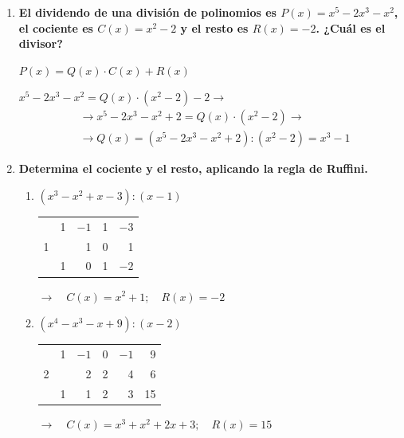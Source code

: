 \documentclass[a4paper,12pt]{article}
\begin{document}
\begin{enumerate}
\begin{enumerate}[label=\textbf{\alph*)}]
            \item $(x^5 + 2x^3 - 1) : (x^2 - 3) \longrightarrow \begin{cases} \text{Cociente} = x^3 + 5x \\ \text{Resto} = 15x - 1 \end{cases}$
        \end{enumerate}
    \item \textbf{El dividendo de una división de polinomios es $P(x) = x^5 - 2x^3 - x^2$, el cociente es $C(x) = x^2 - 2$ y el resto es $R(x) = -2$. ¿Cuál es el divisor?}

        \vspace{0.3cm}

        $P(x) = Q(x) \cdot C(x) + R(x)$

        $x^5 - 2x^3 - x^2 = Q(x) \cdot (x^2 - 2) - 2 \longrightarrow$
        \begin{align*}
        &\longrightarrow x^5 - 2x^3 - x^2 + 2 = Q(x) \cdot (x^2 - 2) \longrightarrow \\
        &\longrightarrow Q(x) = (x^5 - 2x^3 - x^2 + 2) : (x^2 - 2) = x^3 - 1
        \end{align*}
\item \textbf{Determina el cociente y el resto, aplicando la regla de Ruffini.}

\begin{enumerate}[label=\textbf{\alph*)}]
    \item $(x^3 - x^2 + x - 3) : (x - 1)$
    
    \begin{center}
    \begin{tabular}{r|rrrr}
      & 1 & $-1$ & 1 & $-3$ \\
    1 &   & 1 & 0 & 1 \\ \hline
      & 1 & 0 & 1 & \multicolumn{1}{|r}{$-2$}
    \end{tabular}
    \quad $\longrightarrow \quad C(x) = x^2 + 1; \quad R(x) = -2$
    \end{center}

    \vspace{0.4cm}

    \item $(x^4 - x^3 - x + 9) : (x - 2)$
    
    \begin{center}
    \begin{tabular}{r|rrrrr}
      & 1 & $-1$ & 0 & $-1$ & 9 \\
    2 &   & 2 & 2 & 4 & 6 \\ \hline
      & 1 & 1 & 2 & 3 & \multicolumn{1}{|r}{15}
    \end{tabular}
    \quad $\longrightarrow \quad C(x) = x^3 + x^2 + 2x + 3; \quad R(x) = 15$
    \end{center}


\end{enumerate}
\end{enumerate}
\end{document}
